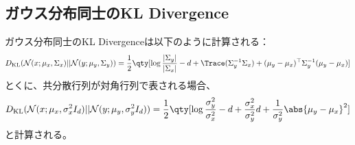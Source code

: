 \documentclass[a4paper,11pt,uplatex]{jsarticle}%
\begin{document}
\subsection{ガウス分布同士のKL Divergence}
ガウス分布同士のKL Divergenceは以下のように計算される：
\begin{equation}
  D_{\text{KL}}(\mathcal{N}(x;\mu_x,\Sigma_x)||\mathcal{N}(y;\mu_y,\Sigma_y)) 
  = \frac{1}{2}\qty[\log{\frac{|\Sigma_y|}{|\Sigma_x|}} - d + \Trace(\Sigma_y^{-1}\Sigma_x) + (\mu_y - \mu_x)^{\top}\Sigma_y^{-1}(\mu_y - \mu_x)]
\end{equation}
とくに、共分散行列が対角行列で表される場合、
\begin{equation}
  D_{\text{KL}}(\mathcal{N}(x;\mu_x,\sigma_x^{2}I_d)||\mathcal{N}(y;\mu_y,\sigma_y^2I_d))
  =  \frac{1}{2}\qty[\log{\frac{\sigma_y^2}{\sigma_x^2}} - d + \frac{\sigma_x^2}{\sigma_y^2}d + \frac{1}{\sigma_y^2}\abs{\mu_y - \mu_x}^2]
\end{equation}
と計算される。
\end{document}

